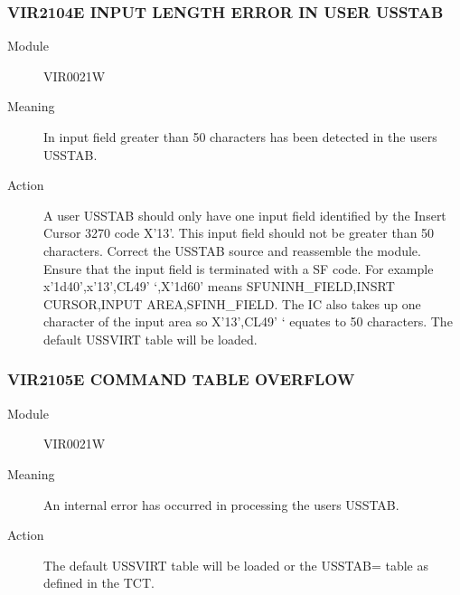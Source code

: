 \documentclass[letterpaper,10pt,english]{sphinxmanual}
\begin{document}
\subsubsection{VIR2104E INPUT LENGTH ERROR IN USER USSTAB}
\label{\detokenize{messages:vir2104e-input-length-error-in-user-usstab}}\begin{description}
\item[{Module}] \leavevmode
VIR0021W

\item[{Meaning}] \leavevmode
In input field greater than 50 characters has been detected in the users USSTAB.

\item[{Action}] \leavevmode
A user USSTAB should only have one input field identified by the Insert Cursor 3270 code X’13’. This input field should not be greater than 50 characters. Correct the USSTAB source and reassemble the module. Ensure that the input field is terminated with a SF code. For example x’1d40’,x’13’,CL49’ ‘,X’1d60’ means SFUNINH\_FIELD,INSRT CURSOR,INPUT AREA,SFINH\_FIELD. The IC also takes up one character of the input area so X’13’,CL49’ ‘ equates to 50 characters. The default USSVIRT table will be loaded.

\end{description}


\subsubsection{VIR2105E COMMAND TABLE OVERFLOW}
\label{\detokenize{messages:vir2105e-command-table-overflow}}\begin{description}
\item[{Module}] \leavevmode
VIR0021W

\item[{Meaning}] \leavevmode
An internal error has occurred in processing the users USSTAB.

\item[{Action}] \leavevmode
The default USSVIRT table will be loaded or the USSTAB= table as defined in the TCT.

\end{description}
\end{document}
